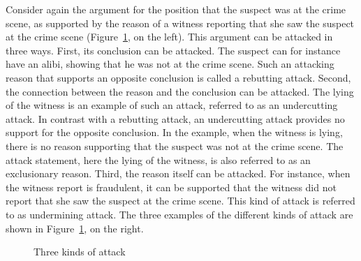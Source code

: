\documentclass[10pt]{article}
\begin{document}
Consider again the argument for the position that the suspect was at the crime scene, as supported by the reason of a witness reporting that she saw the suspect at the crime scene (Figure~\ref{fig:arg3}, on the left). This argument can be attacked in three ways. First, its conclusion can be attacked. The suspect can for instance have an alibi, showing that he was not at the crime scene. Such an attacking reason that supports an opposite conclusion is called a rebutting attack. Second, the connection between the reason and the conclusion can be attacked. The lying of the witness is an example of such an attack, referred to as an undercutting attack. In contrast with a rebutting attack, an undercutting attack provides no support for the opposite conclusion. In the example, when the witness is lying, there is no reason supporting that the suspect was not at the crime scene. The attack statement, here the lying of the witness, is also referred to as an exclusionary reason. Third, the reason itself can be attacked. For instance, when the witness report is fraudulent, it can be supported that the witness did not report that she saw the suspect at the crime scene. This kind of attack is referred to as undermining attack. The three examples of the different kinds of attack are shown in Figure~\ref{fig:arg3}, on the right.


\begin{figure}[bt]
\centering

\caption{Three kinds of attack\label{fig:arg3}}
\end{figure}
\end{document}
